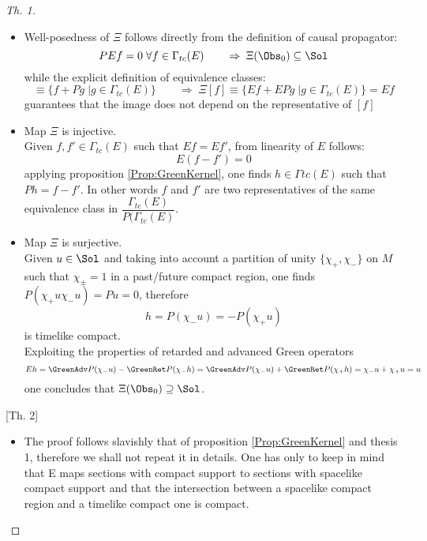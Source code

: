 \documentclass[Main]{subfiles}
\begin{document}
	\begin{proof}
	[Th. 1]
	\begin{itemize}
		\item Well-posedness of $\Xi$ follows directly from the definition of causal propagator:
			\begin{displaymath}
				P E f = 0 \; \forall f \in \Gamma_{tc}(E) \qquad \Rightarrow \; \Xi ( \Obs_0) \subseteq \Sol
			\end{displaymath}
			while the explicit definition of equivalence classes:
			\begin{displaymath}
				[f] \equiv \{ f + P g \; \vert g \in \Gamma_{tc}(E)\} \qquad\Rightarrow \;
				 \Xi [f] \equiv \{ E f + E P g \;\vert g \in \Gamma_{tc}(E)\} = E f
			\end{displaymath}
			guarantees that the image does not depend on the representative of $[f]$
		\item %
			Map $\Xi$ is injective.\\
			Given $f , f' \in \Gamma_{tc}(E)$ such that $E f = E f'$, from linearity of $E$ follows:
			\begin{displaymath}
				E ( f - f') = 0
			\end{displaymath}			
			applying proposition \ref{Prop:GreenKernel}, one finds $h \in \Gamma{tc}(E)$ such that $P h = f - f'$. 
			In other words $f$ and $f'$  are two representatives of the same equivalence class in $\dfrac{\Gamma_{tc}(E)}{P ( \Gamma_{tc}(E)} $.
		\item Map $\Xi$ is surjective.\\
			Given $u \in \Sol$ and taking into account a partition of unity $\{\chi_+, \chi_-\}$ on $M$ such that $\chi_\pm = 1$ in a past/future compact region, one finds $P ( \chi_+ u \chi_- u ) = P u=0$, therefore 
			\begin{displaymath}
				h = P(\chi_-u) = - P(\chi_+ u)
			\end{displaymath}
			is timelike compact.\\
			Exploiting the properties of retarded and advanced Green operators
			\begin{displaymath}
				E h = \GreenAdv P (\chi_- u ) - \GreenRet P (\chi_- h ) = \GreenAdv P (\chi_- u ) + \GreenRet P (\chi_+ h ) = \chi_-u + \chi_+ u = u
			\end{displaymath} 
			one concludes that $\Xi ( \Obs_0) \supseteq \Sol$.
	\end{itemize}
	[Th. 2]
	\begin{itemize}
		\item The proof follows slavishly that of proposition \ref{Prop:GreenKernel} and thesis 1, therefore we shall not repeat it in details. 
			One has only to keep in mind that E maps sections with compact support to sections with spacelike compact support and that the intersection between a spacelike compact region and a timelike compact one is compact.
	\end{itemize}		
	\end{proof}
	
\end{document}
